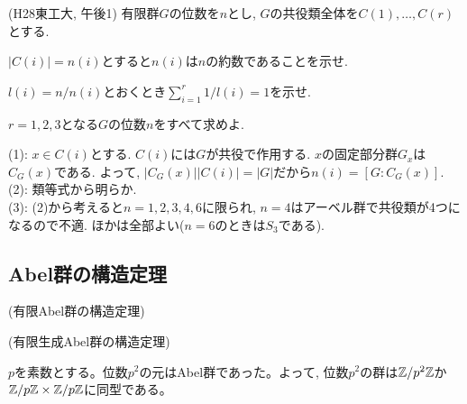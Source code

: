 \begin{egprob} (H28東工大, 午後1)
有限群$G$の位数を$n$とし, $G$の共役類全体を$C(1),\dots, C(r)$とする.
\ben
\item $|C(i)| = n(i)$とすると$n(i)$は$n$の約数であることを示せ.
\item $l(i) = n/n(i)$とおくとき$\sum_{i=1}^{r} 1/l(i) = 1$を示せ.
\item $r=1,2,3$となる$G$の位数$n$をすべて求めよ.
\een
\end{egprob}
\begin{egans}
(1): $x\in C(i)$とする. $C(i)$には$G$が共役で作用する. $x$の固定部分群$G_x$は$C_G(x)$である. よって, $|C_G(x)||C(i)| = |G|$だから$n(i) = [G:C_G(x)]$. \\
(2): 類等式から明らか. \\
(3): (2)から考えると$n=1,2,3,4,6$に限られ, $n=4$はアーベル群で共役類が4つになるので不適. ほかは全部よい($n=6$のときは$S_3$である).
\end{egans}





\subsection{Abel群の構造定理}
\begin{theo} (有限Abel群の構造定理)
\end{theo}
\begin{theo} (有限生成Abel群の構造定理)

\end{theo}


\begin{eg}
$p$を素数とする。位数$p^2$の元はAbel群であった。よって, 位数$p^2$の群は$\mathbb{Z}/p^2\mathbb{Z}$か$\mathbb{Z}/p\mathbb{Z}\times \mathbb{Z}/p\mathbb{Z}$に同型である。
\end{eg}

